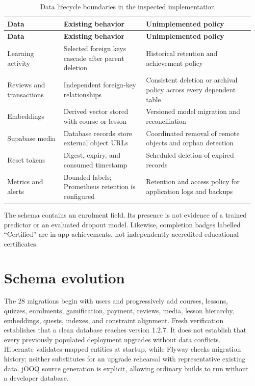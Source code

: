 \documentclass[12pt,a4paper,oneside]{report}
\newcommand{\migrationcount}{28}
\begin{document}
\begin{longtable}{P{0.24\textwidth}P{0.34\textwidth}P{0.31\textwidth}}
\caption{Data lifecycle boundaries in the inspected implementation}\label{tab:data-lifecycle}\\\toprule
\textbf{Data} & \textbf{Existing behavior} & \textbf{Unimplemented policy}\\\midrule\endfirsthead
\toprule\textbf{Data} & \textbf{Existing behavior} & \textbf{Unimplemented policy}\\\midrule\endhead
Learning activity & Selected foreign keys cascade after parent deletion & Historical retention and achievement policy\\
Reviews and transactions & Independent foreign-key relationships & Consistent deletion or archival policy across every dependent table\\
Embeddings & Derived vector stored with course or lesson & Versioned model migration and reconciliation\\
Supabase media & Database records store external object URLs & Coordinated removal of remote objects and orphan detection\\
Reset tokens & Digest, expiry, and consumed timestamp & Scheduled deletion of expired records\\
Metrics and alerts & Bounded labels; Prometheus retention is configured & Retention and access policy for application logs and backups\\
\bottomrule
\end{longtable}

The schema contains an  enrolment field. Its presence is
not evidence of a trained predictor or an evaluated dropout model. Likewise,
completion badges labelled ``Certified'' are in-app achievements, not independently
accredited educational certificates.

\section{Schema evolution}
The \migrationcount{} migrations begin with users and progressively add courses, lessons, quizzes,
enrolments, gamification, payment, reviews, media, lesson hierarchy, embeddings,
quests, indexes, and constraint alignment. Fresh verification establishes that a
clean database reaches version 1.2.7. It does not establish that every previously
populated deployment upgrades without data conflicts. Hibernate validates mapped
entities at startup, while Flyway checks migration history; neither substitutes for
an upgrade rehearsal with representative existing data. jOOQ source generation is
explicit, allowing ordinary builds to run without a developer database.
\end{document}
